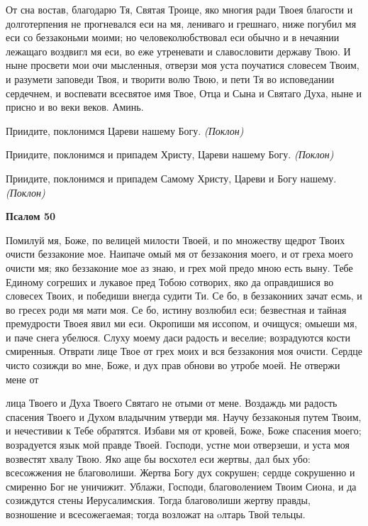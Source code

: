    От сна востав, благодарю Тя, Святая Троице, яко многия ради Твоея
благости и долготерпения не прогневался еси на мя, лениваго и грешнаго,
ниже погубил мя еси со беззаконьми моими; но человеколюбствовал еси
обычно и в нечаянии лежащаго воздвигл мя еси, во еже утреневати и
славословити державу Твою. И ныне просвети мои очи мысленныя, отверзи
моя уста поучатися словесем Твоим, и разумети заповеди Твоя, и творити
волю Твою, и пети Тя во исповедании сердечнем, и воспевати всесвятое имя
Твое, Отца и Сына и Святаго Духа, ныне и присно и во веки веков.
Аминь.



   Приидите, поклонимся Цареви нашему Богу. \itshape  (Поклон)\normalfont{}



   Приидите, поклонимся и припадем Христу, Цареви нашему Богу. \itshape 
(Поклон)\normalfont{}



   Приидите, поклонимся и припадем Самому Христу, Цареви и Богу
нашему. \itshape  (Поклон)\normalfont{}



 

\bfseries Псалом 50\normalfont{}


   Помилуй мя, Боже, по велицей милости Твоей, и по множеству щедрот
Твоих очисти беззаконие мое. Наипаче омый мя от беззакония моего, и от
греха моего очисти мя; яко беззаконие мое аз знаю, и грех мой предо мною
есть выну. Тебе Единому согреших и лукавое пред Тобою сотворих, яко да
оправдишися во словесех Твоих, и победиши внегда судити Ти. Се бо, в
беззакониих зачат есмь, и во гресех роди мя мати моя. Се бо, истину
возлюбил еси; безвестная и тайная премудрости Твоея явил ми еси.
Окропиши мя иссопом, и очищуся; омыеши мя, и паче снега убелюся. Слуху
моему даси радость и веселие; возрадуются кости смиренныя. Отврати лице
Твое от грех моих и вся беззакония моя очисти. Сердце чисто созижди во
мне, Боже, и дух прав обнови во утробе моей. Не отвержи мене от

лица Твоего и Духа Твоего Святаго не отыми от мене. Воздаждь ми
радость спасения Твоего и Духом владычним утверди мя. Научу
беззаконыя путем Твоим, и нечестивии к Тебе обратятся. Избави мя от
кровей, Боже, Боже спасения моего; возрадуется язык мой правде
Твоей. Господи, устне мои отверзеши, и уста моя возвестят хвалу
Твою. Яко аще бы восхотел еси жертвы, дал бых убо: всесожжения не
благоволиши. Жертва Богу дух сокрушен; сердце сокрушенно и смиренно
Бог не уничижит. Ублажи, Господи, благоволением Твоим Сиона, и
да созиждутся стены Иерусалимския. Тогда благоволиши жертву
правды, возношение и всесожегаемая; тогда возложат на oлтарь Твой
тельцы.



